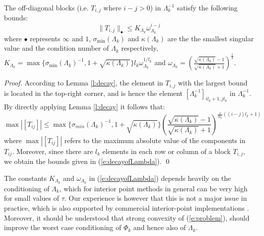 \begin{proposition} \label{p:decayofLambda}
The off-diagonal blocks (i.e. $T_{i,j}$ where $i - j > 0$) in $\Lambda_k^{-1}$ satisfy the following bounds:
\begin{equation} \label{e:decayofLambda}
\| T_{i,j} \|_\bullet \leq K_{\Lambda_k} \omega_{\Lambda_k}^{i - j}
\end{equation}
where $\bullet$ represents $\infty$ and $1$, $\sigma_{\min}(\Lambda_k)$ and $\kappa(\Lambda_k)$ are the the smallest singular value and the condition number of $\Lambda_k$ respectively, $K_{\Lambda_k} = \max \{ \sigma_{\min}(\Lambda_k)^{-1}, 1 + \sqrt{\kappa(\Lambda_k)} \} l_k \omega_{\Lambda_k}^{1/l_k}$ and $\omega_{\Lambda_k} = \left( \frac{\sqrt{\kappa(\Lambda_k)} - 1}{\sqrt{\kappa(\Lambda_k)} + 1} \right)^{\frac{1}{3}}$.
\end{proposition}

\begin{proof}
According to Lemma \ref{l:decay}, the element in $T_{i,j}$ with the largest bound is located in the top-right corner, and is hence the element $[\Lambda_k^{-1}]_{i l_k + 1, j l_k}$ in $\Lambda_k^{-1}$. By directly applying Lemma \ref{l:decay} it follows that:
\begin{equation}
\max \left| [ T_{ij} ] \right| \leq \max \{ \sigma_{min}(\Lambda_k)^{-1}, 1 +  \sqrt{\kappa(\Lambda_k)} \} \left( \frac{ \sqrt{\kappa(\Lambda_k)} - 1}{ \sqrt{\kappa(\Lambda_k)} + 1} \right)^{\frac{1}{3l_k}((i - j)l_k + 1)}
\end{equation}
where $\max \left| [ T_{ij} ] \right| $ refers to the maximum absolute value of the components in $T_{ij}$. Moreover, since there are $l_k$ elements in each row or column of a block $T_{i,j}$, we obtain the bounds given in (\ref{e:decayofLambda}).
\qed
\end{proof}
\begin{remark}
The constants $K_{\Lambda_k}$ and $\omega_{\Lambda_k}$ in (\ref{e:decayofLambda}) depends heavily on the conditioning of $\Lambda_k$, which for interior point methods in general can be very high for small values of $\tau$. Our experience is however that this is not a major issue in practice, which is also supported by commercial interior-point implementations \cite{WrightM1998} \cite{Domahidi2012}. Moreover, it should be understood that strong convexity of (\ref{e:problem}), should improve the worst case conditioning of $\Phi_k$ and hence also of $\Lambda_k$.
\end{remark}

